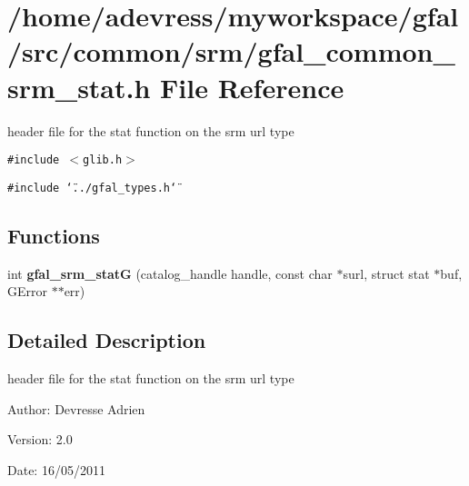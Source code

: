 \section{/home/adevress/myworkspace/gfal/src/common/srm/gfal\_\-common\_\-srm\_\-stat.h File Reference}
\label{gfal__common__srm__stat_8h}
header file for the stat function on the srm url type 

{\tt \#include $<$glib.h$>$}\par
{\tt \#include \char`\"{}../gfal\_\-types.h\char`\"{}}\par
\subsection*{Functions}
\begin{CompactItemize}
\item 
int \textbf{gfal\_\-srm\_\-stat\-G} (catalog\_\-handle handle, const char $\ast$surl, struct stat $\ast$buf, GError $\ast$$\ast$err)\label{gfal__common__srm__stat_8h_f7d374066f088638c5afe77ef8a1dd7c}

\end{CompactItemize}


\subsection{Detailed Description}
header file for the stat function on the srm url type 

\begin{Desc}
\item[Author:]Devresse Adrien \end{Desc}
\begin{Desc}
\item[Version:]2.0 \end{Desc}
\begin{Desc}
\item[Date:]16/05/2011 \end{Desc}
